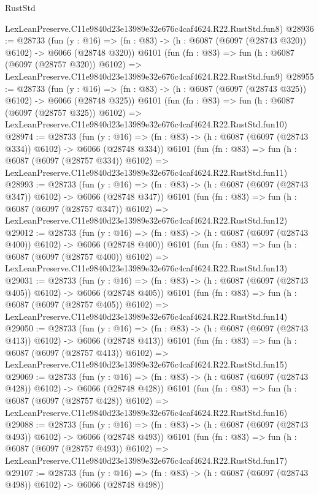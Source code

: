 \begin{lexlean}{RustStd}
\begin{coremodule}
    LexLeanPreserve.C11e9840d23e13989e32e676c4caf4624.R22.RustStd.fun8)
@28936 := @28733
    (fun (y : @16) => (fn : @83) -> (h : @6087 (@6097 (@28743 @320)) @6102) -> @6066 (@28748 @320))
    @6101
    (fun (fn : @83) =>
    fun (h : @6087 (@6097 (@28757 @320)) @6102) =>
    LexLeanPreserve.C11e9840d23e13989e32e676c4caf4624.R22.RustStd.fun9)
@28955 := @28733
    (fun (y : @16) => (fn : @83) -> (h : @6087 (@6097 (@28743 @325)) @6102) -> @6066 (@28748 @325))
    @6101
    (fun (fn : @83) =>
    fun (h : @6087 (@6097 (@28757 @325)) @6102) =>
    LexLeanPreserve.C11e9840d23e13989e32e676c4caf4624.R22.RustStd.fun10)
@28974 := @28733
    (fun (y : @16) => (fn : @83) -> (h : @6087 (@6097 (@28743 @334)) @6102) -> @6066 (@28748 @334))
    @6101
    (fun (fn : @83) =>
    fun (h : @6087 (@6097 (@28757 @334)) @6102) =>
    LexLeanPreserve.C11e9840d23e13989e32e676c4caf4624.R22.RustStd.fun11)
@28993 := @28733
    (fun (y : @16) => (fn : @83) -> (h : @6087 (@6097 (@28743 @347)) @6102) -> @6066 (@28748 @347))
    @6101
    (fun (fn : @83) =>
    fun (h : @6087 (@6097 (@28757 @347)) @6102) =>
    LexLeanPreserve.C11e9840d23e13989e32e676c4caf4624.R22.RustStd.fun12)
@29012 := @28733
    (fun (y : @16) => (fn : @83) -> (h : @6087 (@6097 (@28743 @400)) @6102) -> @6066 (@28748 @400))
    @6101
    (fun (fn : @83) =>
    fun (h : @6087 (@6097 (@28757 @400)) @6102) =>
    LexLeanPreserve.C11e9840d23e13989e32e676c4caf4624.R22.RustStd.fun13)
@29031 := @28733
    (fun (y : @16) => (fn : @83) -> (h : @6087 (@6097 (@28743 @405)) @6102) -> @6066 (@28748 @405))
    @6101
    (fun (fn : @83) =>
    fun (h : @6087 (@6097 (@28757 @405)) @6102) =>
    LexLeanPreserve.C11e9840d23e13989e32e676c4caf4624.R22.RustStd.fun14)
@29050 := @28733
    (fun (y : @16) => (fn : @83) -> (h : @6087 (@6097 (@28743 @413)) @6102) -> @6066 (@28748 @413))
    @6101
    (fun (fn : @83) =>
    fun (h : @6087 (@6097 (@28757 @413)) @6102) =>
    LexLeanPreserve.C11e9840d23e13989e32e676c4caf4624.R22.RustStd.fun15)
@29069 := @28733
    (fun (y : @16) => (fn : @83) -> (h : @6087 (@6097 (@28743 @428)) @6102) -> @6066 (@28748 @428))
    @6101
    (fun (fn : @83) =>
    fun (h : @6087 (@6097 (@28757 @428)) @6102) =>
    LexLeanPreserve.C11e9840d23e13989e32e676c4caf4624.R22.RustStd.fun16)
@29088 := @28733
    (fun (y : @16) => (fn : @83) -> (h : @6087 (@6097 (@28743 @493)) @6102) -> @6066 (@28748 @493))
    @6101
    (fun (fn : @83) =>
    fun (h : @6087 (@6097 (@28757 @493)) @6102) =>
    LexLeanPreserve.C11e9840d23e13989e32e676c4caf4624.R22.RustStd.fun17)
@29107 := @28733
    (fun (y : @16) => (fn : @83) -> (h : @6087 (@6097 (@28743 @498)) @6102) -> @6066 (@28748 @498))

\end{coremodule}
\end{lexlean}
